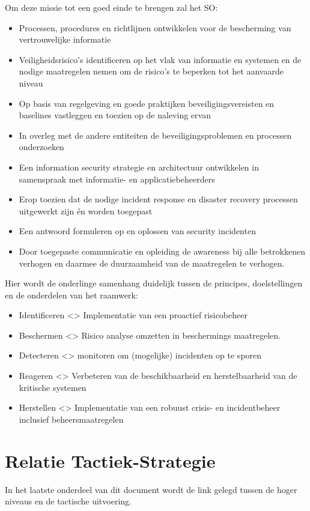 \documentclass[11pt]{article}
\begin{document}
Om deze missie tot een goed einde te brengen zal het SO:
\begin{itemize}
\item Processen, procedures en richtlijnen ontwikkelen voor de bescherming van vertrouwelijke informatie
\item Veiligheidsrisico's identificeren op het vlak van informatie en systemen en de nodige maatregelen nemen om de risico's te beperken tot het aanvaarde niveau
\item Op basis van regelgeving en goede praktijken beveiligingsvereisten en baselines vastleggen en toezien op de naleving ervan
\item In overleg met de andere entiteiten de beveiligingsproblemen en processen onderzoeken
\item Een information security strategie en architectuur ontwikkelen in samenspraak met informatie- en applicatiebeheerders
\item Erop toezien dat de nodige incident response en disaster recovery processen uitgewerkt zijn én worden toegepast
\item Een antwoord formuleren op en oplossen van security incidenten
\item Door toegepaste communicatie en opleiding de awareness bij alle betrokkenen verhogen en daarmee de duurzaamheid van de maatregelen te verhogen.
\end{itemize}

Hier wordt de onderlinge samenhang duidelijk tussen de principes, doelstellingen en de onderdelen van het raamwerk:
\begin{itemize}
\item Identificeren <> Implementatie van een proactief risicobeheer
\item Beschermen <> Risico analyse omzetten in beschermings maatregelen.
\item Detecteren <> monitoren om (mogelijke) incidenten op te sporen
\item Reageren <> Verbeteren van de beschikbaarheid en herstelbaarheid van de kritische systemen
\item Herstellen <> Implementatie van een robuust crisis- en incidentbeheer inclusief beheersmaatregelen
\end{itemize}

\section{Relatie Tactiek-Strategie}
\label{sec:org855b914}
In het laatste onderdeel van dit document wordt de link gelegd tussen de hoger niveaus en de tactische uitvoering.
\end{document}
